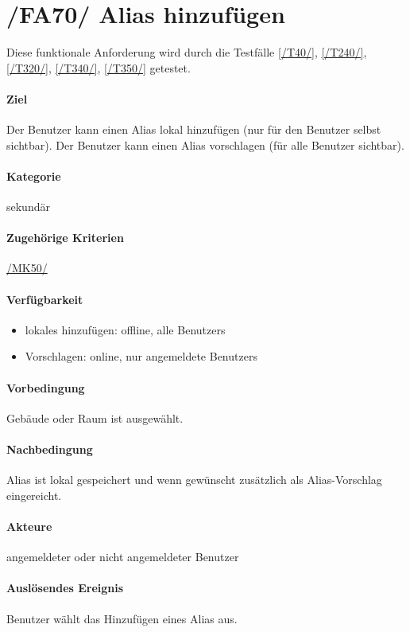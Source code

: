 \section[Alias hinzufügen]{/FA70/ Alias hinzufügen}
\label{/FA70/}
Diese funktionale Anforderung wird durch die Testfälle \ref{/T40/}, \ref{/T240/}, \ref{/T320/}, \ref{/T340/}, \ref{/T350/} getestet.
\paragraph{Ziel}
Der \Gls{Benutzer} kann einen \Gls{Alias} \gls{lokal} hinzufügen (nur für den \Gls{Benutzer} selbst sichtbar). Der \Gls{Benutzer} kann einen \Gls{Alias} vorschlagen (für alle \Gls{Benutzer} sichtbar).
\paragraph{Kategorie}
sekundär
\paragraph{Zugehörige Kriterien}
\hyperref[/MK50/]{/MK50/}
\paragraph{Verfügbarkeit}
\begin{itemize}
    \item \Gls{lokal}es hinzufügen: \gls{offline}, alle \Glspl{Benutzer}
    \item Vorschlagen: online, nur angemeldete \Glspl{Benutzer}
\end{itemize}

\paragraph{Vorbedingung}
Gebäude oder Raum ist ausgewählt.
\paragraph{Nachbedingung}
\Gls{Alias} ist \gls{lokal} gespeichert und wenn gewünscht zusätzlich als \Gls{Alias-Vorschlag} eingereicht.
\paragraph{Akteure}
angemeldeter oder nicht angemeldeter \Gls{Benutzer}
\paragraph{Auslösendes Ereignis}
\Gls{Benutzer} wählt das Hinzufügen eines \Gls{Alias} aus.
